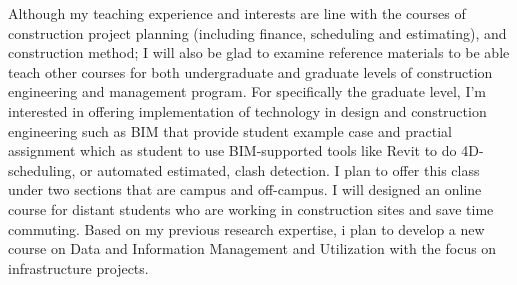 \documentclass[a4paper,11pt]{article}
\begin{document}
\par
%
Although my teaching experience and interests are line with the courses of construction project planning (including finance, scheduling and estimating), and construction method; I will also be glad to examine reference materials to be able teach other courses for both undergraduate and graduate levels of construction engineering and management program. 
%
For specifically the graduate level, I'm interested in offering implementation of technology in design and construction engineering such as BIM that provide student example case and practial assignment which as student to use BIM-supported tools like Revit to do 4D-scheduling, or automated estimated, clash detection. I plan to offer this class under two sections that are campus and off-campus. I will designed an online course for distant students who are working in construction sites and save time commuting. Based on my previous research expertise, i plan to develop a new course on Data and Information Management and Utilization with the focus on infrastructure projects. 
\end{document}
